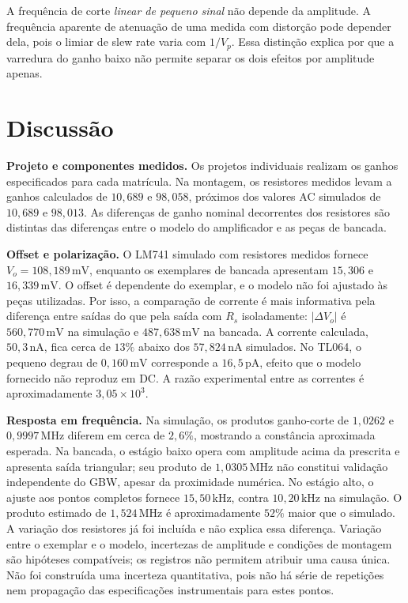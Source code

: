 \documentclass[11pt,a4paper]{article}
\begin{document}
A frequência de corte \emph{linear de pequeno sinal} não depende da amplitude.
A frequência aparente de atenuação de uma medida com distorção pode depender dela,
pois o limiar de slew rate varia com \(1/V_p\). Essa distinção explica por que a
varredura do ganho baixo não permite separar os dois efeitos por amplitude apenas.

\section{Discussão}
\label{sec:discussao}

\textbf{Projeto e componentes medidos.} Os projetos individuais realizam os ganhos
especificados para cada matrícula. Na montagem, os resistores medidos levam a ganhos
calculados de \(10{,}689\) e \(98{,}058\), próximos dos valores AC simulados de
\(10{,}689\) e \(98{,}013\). As diferenças de ganho nominal decorrentes dos resistores
são distintas das diferenças entre o modelo do amplificador e as peças de bancada.

\textbf{Offset e polarização.} O LM741 simulado com resistores medidos fornece
\(V_o=108{,}189\,\text{mV}\), enquanto os exemplares de bancada apresentam
\(15{,}306\) e \(16{,}339\,\text{mV}\). O offset é dependente do exemplar, e o modelo
não foi ajustado às peças utilizadas. Por isso, a comparação de corrente é mais
informativa pela diferença entre saídas do que pela saída com \(R_s\) isoladamente:
\(\lvert\Delta V_o\rvert\) é \(560{,}770\,\text{mV}\) na simulação e
\(487{,}638\,\text{mV}\) na bancada. A corrente calculada, \(50{,}3\,\text{nA}\),
fica cerca de \(13\%\) abaixo dos \(57{,}824\,\text{nA}\) simulados.
No TL064, o pequeno degrau de \(0{,}160\,\text{mV}\) corresponde a
\(16{,}5\,\text{pA}\), efeito que o modelo fornecido não reproduz em DC.
A razão experimental entre as correntes é aproximadamente \(3{,}05\times10^3\).

\textbf{Resposta em frequência.} Na simulação, os produtos ganho-corte de
\(1{,}0262\) e \(0{,}9997\,\text{MHz}\) diferem em cerca de \(2{,}6\%\), mostrando
a constância aproximada esperada. Na bancada, o estágio baixo opera com amplitude
acima da prescrita e apresenta saída triangular; seu produto de \(1{,}0305\,\text{MHz}\)
não constitui validação independente do GBW, apesar da proximidade numérica.
No estágio alto, o ajuste aos pontos completos fornece \(15{,}50\,\text{kHz}\),
contra \(10{,}20\,\text{kHz}\) na simulação. O produto estimado de
\(1{,}524\,\text{MHz}\) é aproximadamente \(52\%\) maior que o simulado.
A variação dos resistores já foi incluída e não explica essa diferença. Variação
entre o exemplar e o modelo, incertezas de amplitude e condições de montagem são
hipóteses compatíveis; os registros não permitem atribuir uma causa única.
Não foi construída uma incerteza quantitativa, pois não há série de repetições nem
propagação das especificações instrumentais para estes pontos.
\end{document}
